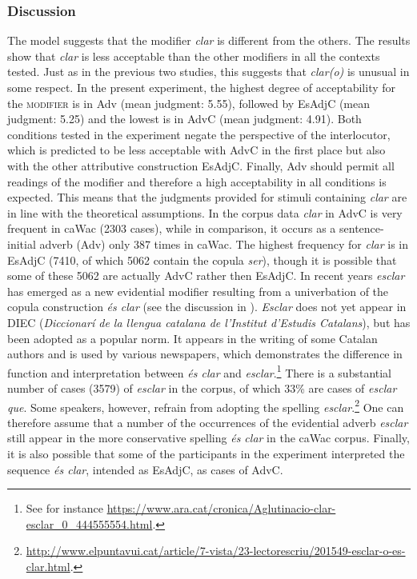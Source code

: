 \subsubsection{Discussion}\largerpage
The model  suggests that the {modifier} \textit{clar} is different from the others.  The results show that \textit{clar} is less acceptable than the other {modifier}s in all the contexts tested. Just as in the previous two studies, this suggests that \textit{clar(o)} is unusual in some respect.  In the present experiment, the highest degree of acceptability for the \textsc{modifier} is in Adv (mean judgment: 5.55), followed by EsAdjC (mean judgment: 5.25) and the lowest is  in AdvC (mean judgment: 4.91). Both conditions tested in the experiment negate the perspective of the interlocutor, which is predicted to be less acceptable with AdvC in the first place but also with the other attributive construction EsAdjC.  Finally, Adv should permit all readings of the modifier and therefore a high acceptability in all conditions is expected. This means that the judgments provided for stimuli containing \emph{clar} are in line with the theoretical assumptions.  In the corpus data \emph{clar} in AdvC is  very frequent in caWac (2303 cases), while  in comparison, it  occurs as a sentence-initial adverb (Adv) only 387 times in caWac. The highest frequency  for \textit{clar} is in EsAdjC (7410, of which 5062 contain the copula \textit{ser}), though it is possible that some of these 5062 are  actually  AdvC rather then EsAdjC. In recent years \emph{esclar} has emerged as a new evidential modifier resulting from a univerbation of the copula construction \emph{és clar} (see the discussion in ). 
\textit{Esclar} does not yet appear in DIEC (\emph{Diccionarí de la llengua catalana de l'Institut d'Estudis Catalans}), but  has been adopted as a popular norm. It appears in the writing of some Catalan authors and is used by various newspapers, which demonstrates   the difference in function and interpretation between \textit{és clar} and \textit{esclar}.\footnote{See for instance \url{https://www.ara.cat/cronica/Aglutinacio-clar-esclar_0_444555554.html}.} There is a substantial number of cases (3579) of \textit{esclar} in the corpus, of which 33\% are cases of \textit{esclar que}. Some speakers, however, refrain from adopting the spelling \textit{esclar}.\footnote{\url{http://www.elpuntavui.cat/article/7-vista/23-lectorescriu/201549-esclar-o-es-clar.html}.} One can therefore assume that a number of the occurrences of the evidential adverb \textit{esclar} still appear in the more conservative spelling \textit{és clar} in the caWac corpus.  Finally, it is also possible that some of the participants in the experiment interpreted the sequence \textit{és clar}, intended as EsAdjC, as cases of AdvC.

